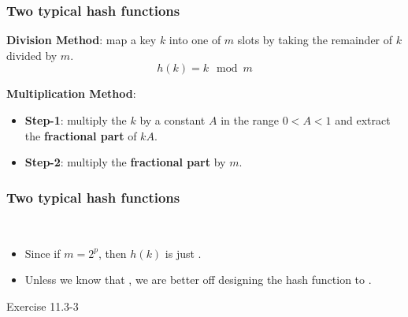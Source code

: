 \documentclass[UTF8,11pt]{beamer}
\begin{document}
\begin{frame}
\frametitle{Two typical hash functions}
 \begin{block}{\textbf{\color{red} Division Method}: map a key $k$ into one of $m$ slots by taking the remainder of $k$ divided by $m$.}
 	\[
 	h(k)=k\mod m
 	\]
 \end{block}

 \begin{block}{\textbf{\color{red} Multiplication Method}:}
	\begin{itemize}
		\item \textbf{\color{blue}Step-1}: multiply the $k$ by a constant $A$ in the range $0<A<1$ and extract the \textbf{\color{blue} fractional part} of $kA$.
		\item \textbf{\color{blue}Step-2}: multiply the \textbf{\color{blue} fractional part}  by $m$.
	\end{itemize}
\end{block}
\end{frame}

\begin{frame}
\frametitle{Two typical hash functions}
	\pause
	\
	\begin{itemize}
		\pause
		\item  Since if $m=2^p$, then $h(k)$ is just .
		\pause
		\item  Unless we know that , we are better off designing the hash function to .
	\end{itemize}

\begin{block}{}
	\pause

	Exercise 11.3-3 
\end{block}
	

\end{frame}
\end{document}
